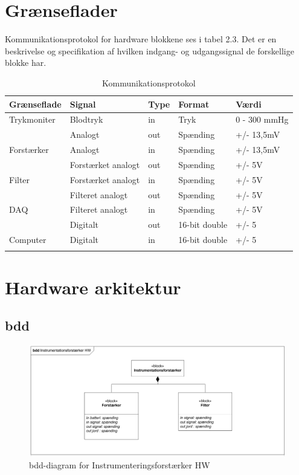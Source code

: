 \section{Grænseflader}
Kommunikationsprotokol for hardware blokkene ses i tabel 2.3. Det er en beskrivelse og specifikation af hvilken indgang- og udgangssignal de forskellige blokke har.   

\begin{longtabu} to 
	\textbf{Grænseflade} & \textbf{Signal} & \textbf{Type} & \textbf{Format} & \textbf{Værdi} \\[-1ex]
	\midrule
	Trykmoniter & Blodtryk & in & Tryk & 0 - 300 mmHg \\[-1ex]
				& Analogt & out & Spænding & +/- 13,5mV \\[-1ex]
	Forstærker  & Analogt & in & Spænding & +/- 13,5mV \\[-1ex]
				& Forstærket analogt & out & Spænding & +/- 5V \\[-1ex]
	Filter 		& Forstærket analogt & in & Spænding & +/- 5V \\				[-1ex]
				& Filteret analogt & out & Spænding & +/- 5V \\[-1ex]
	DAQ			& Filteret analogt & in & Spænding & +/- 5V \\				[-1ex]	
				& Digitalt & out & 16-bit double & +/- 5 \\[-1ex]
	Computer	& Digitalt & in & 16-bit double & +/- 5 \\[-1ex]
	\caption{Kommunikationsprotokol}	
\end{longtabu}


\section{Hardware arkitektur}

\subsection{bdd}

\begin{figure}[H]
	\centering
	\includegraphics[width=1\textwidth]{Figurer/Snip20151104_46}
	\caption{bdd-diagram for Instrumenteringsforstærker HW}
	\label{fig:bddhw-diagram}
\end{figure}

